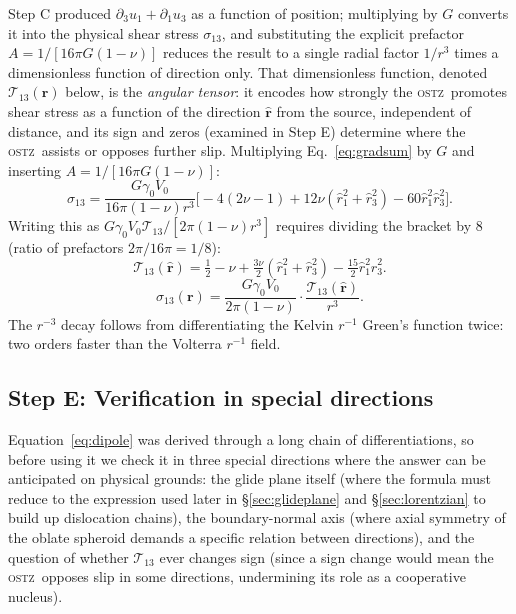 \documentclass[5p,sort&compress]{elsarticle}
\newcommand{\OSTZ}{\textsc{ostz}}
\newcommand{\gz}{\gamma_0}
\begin{document}
Step C produced $\partial_3u_1+\partial_1u_3$ as a function of
position; multiplying by $G$ converts it into the physical shear
stress $\sigma_{13}$, and substituting the explicit prefactor
$A=1/[16\pi G(1-\nu)]$ reduces the result to a single radial factor
$1/r^3$ times a dimensionless function of direction only. That
dimensionless function, denoted $\mathcal T_{13}(\hat{\mathbf r})$
below, is the \emph{angular tensor}: it encodes how strongly the
\OSTZ\ promotes shear stress as a function of the direction
$\hat{\mathbf r}$ from the source, independent of distance, and its
sign and zeros (examined in Step E) determine where the \OSTZ\
assists or opposes further slip. Multiplying Eq.~\eqref{eq:gradsum}
by $G$ and inserting $A=1/[16\pi G(1-\nu)]$:
\[
  \sigma_{13}=\frac{G\gz V_0}{16\pi(1-\nu)r^3}
  \bigl[-4(2\nu-1)+12\nu(\hat r_1^2+\hat r_3^2)-60\hat r_1^2\hat r_3^2
  \bigr].
\]
Writing this as $G\gz V_0\mathcal T_{13}/[2\pi(1-\nu)r^3]$ requires
dividing the bracket by 8 (ratio of prefactors $2\pi/16\pi=1/8$):
\begin{equation}
  \boxed{\mathcal T_{13}(\hat{\mathbf r})
  =\tfrac{1}{2}-\nu+\tfrac{3\nu}{2}(\hat r_1^2+\hat r_3^2)
  -\tfrac{15}{2}\hat r_1^2\hat r_3^2.}
  \label{eq:Tij}
\end{equation}
\begin{equation}
  \boxed{\sigma_{13}(\mathbf r)=\frac{G\gz V_0}{2\pi(1-\nu)}
  \cdot\frac{\mathcal T_{13}(\hat{\mathbf r})}{r^3}.}
  \label{eq:dipole}
\end{equation}
The $r^{-3}$ decay follows from differentiating the Kelvin $r^{-1}$
Green's function twice: two orders faster than the Volterra $r^{-1}$
field.

\subsection{Step E: Verification in special directions}
\label{sec:stepE}

Equation~\eqref{eq:dipole} was derived through a long chain of
differentiations, so before using it we check it in three special
directions where the answer can be anticipated on physical grounds:
the glide plane itself (where the formula must reduce to the
expression used later in \S\ref{sec:glideplane} and
\S\ref{sec:lorentzian} to build up dislocation chains), the
boundary-normal axis (where axial symmetry of the oblate spheroid
demands a specific relation between directions), and the question of
whether $\mathcal T_{13}$ ever changes sign (since a sign change
would mean the \OSTZ\ opposes slip in some directions, undermining
its role as a cooperative nucleus).
\end{document}
